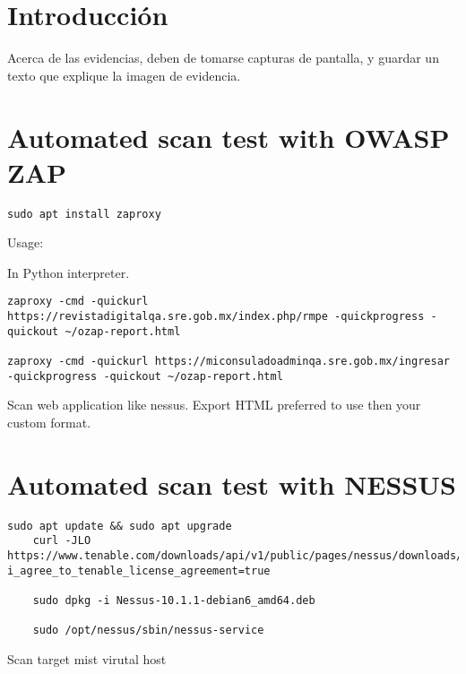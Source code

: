 


\section{Introducción}

Acerca de las evidencias, deben de tomarse capturas de pantalla, y guardar un texto que explique la imagen de evidencia.

\section{Automated scan test with OWASP ZAP}


\begin{lstlisting}[numbers=none]
sudo apt install zaproxy
\end{lstlisting}
 
Usage:

In Python interpreter.

\begin{lstlisting}[numbers=none]
zaproxy -cmd -quickurl https://revistadigitalqa.sre.gob.mx/index.php/rmpe -quickprogress -quickout ~/ozap-report.html 

zaproxy -cmd -quickurl https://miconsuladoadminqa.sre.gob.mx/ingresar -quickprogress -quickout ~/ozap-report.html

\end{lstlisting}

Scan web application like nessus.
Export HTML preferred to use then your custom format.

\section{Automated scan test with NESSUS}


\begin{lstlisting}[numbers=none]
	sudo apt update && sudo apt upgrade
	curl -JLO https://www.tenable.com/downloads/api/v1/public/pages/nessus/downloads/16503/download?i_agree_to_tenable_license_agreement=true
	 
	sudo dpkg -i Nessus-10.1.1-debian6_amd64.deb
	 
	sudo /opt/nessus/sbin/nessus-service
\end{lstlisting}
 
Scan target mist virutal host 

